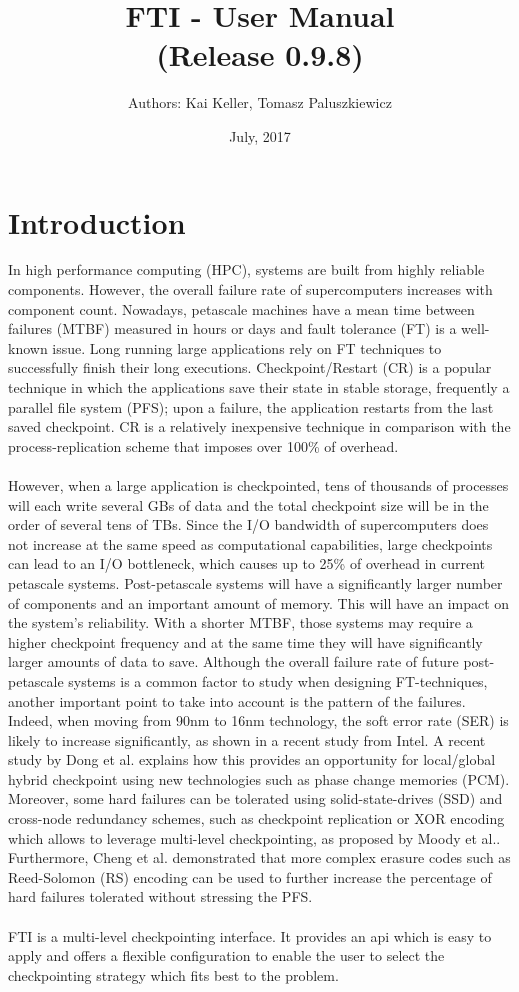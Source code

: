 \documentclass{refrep}
\title{FTI - User Manual  \\ {\small(Release 0.9.8)}}
\author{Authors: Kai Keller, Tomasz Paluszkiewicz}
\date{July, 2017}
\begin{document}
\maketitle
\tableofcontents
\newpage
\chapter{Introduction}\label{ch:introduction}
In high performance computing (HPC), systems are built from highly reliable components. However, the overall failure rate of supercomputers increases with component count. Nowadays, petascale machines have a mean time between failures (MTBF) measured in hours or days and fault tolerance (FT) is a well-known issue. Long running large applications rely on FT techniques to successfully finish their long executions. Checkpoint/Restart (CR) is a popular technique in which the applications save their state in stable storage, frequently a parallel file system (PFS); upon a failure, the application restarts from the last saved checkpoint. CR is a relatively inexpensive technique in comparison with the process-replication scheme that imposes over 100\% of overhead.
\\{}\\
However, when a large application is checkpointed, tens of thousands of processes will each write several GBs of data and the total checkpoint size will be in the order of several tens of TBs. Since the I/O bandwidth of supercomputers does not increase at the same speed as computational capabilities, large checkpoints can lead to an I/O bottleneck, which causes up to 25\% of overhead in current petascale systems. Post-petascale systems will have a significantly larger number of components and an important amount of memory. This will have an impact on the system’s reliability. With a shorter MTBF, those systems may require a higher checkpoint frequency and at the same time they will have significantly larger amounts of data to save. Although the overall failure rate of future post-petascale systems is a common factor to study when designing FT-techniques, another important point to take into account is the pattern of the failures. Indeed, when moving from 90nm to 16nm technology, the soft error rate (SER) is likely to increase significantly, as shown in a recent study from Intel. A recent study by Dong et al. explains how this provides an opportunity for local/global hybrid checkpoint using new technologies such as phase change memories (PCM). Moreover, some hard failures can be tolerated using solid-state-drives (SSD) and cross-node redundancy schemes, such as checkpoint replication or XOR encoding which allows to leverage multi-level checkpointing, as proposed by Moody et al.. Furthermore, Cheng et al. demonstrated that more complex erasure codes such as Reed-Solomon (RS) encoding can be used to further increase the percentage of hard failures tolerated without stressing the PFS.
\\{}\\
FTI is a multi-level checkpointing interface. It provides an api which is easy to apply and offers a flexible configuration to enable the user to select the checkpointing strategy which fits best to the problem.
\end{document}
